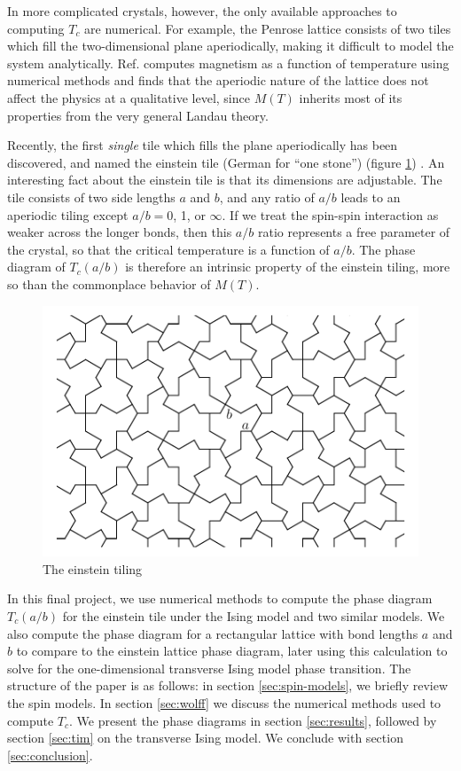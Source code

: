 \documentclass[amsmath,amssymb,aps,twocolumn,nofootinbib]{revtex4-2}
\begin{document}
In more complicated crystals, however, the only available approaches to computing $T_c$ are numerical. For example, the Penrose lattice consists of two tiles which fill the two-dimensional plane aperiodically, making it difficult to model the system analytically. Ref. \cite{penrose-ising} computes magnetism as a function of temperature using numerical methods and finds that the aperiodic nature of the lattice does not affect the physics at a qualitative level, since $M(T)$ inherits most of its properties from the very general Landau theory.

Recently, the first \textit{single} tile which fills the plane aperiodically has been discovered, and named the einstein tile (German for ``one stone'') (figure \ref{fig:einstein}) \cite{smith2023aperiodic}. An interesting fact about the einstein tile is that its dimensions are adjustable. The tile consists of two side lengths $a$ and $b$, and any ratio of $a/b$ leads to an aperiodic tiling except $a/b=0$, 1, or $\infty$. If we treat the spin-spin interaction as weaker across the longer bonds, then this $a/b$ ratio represents a free parameter of the crystal, so that the critical temperature is a function of $a/b$. The phase diagram of $T_c(a/b)$ is therefore an intrinsic property of the einstein tiling, more so than the commonplace behavior of $M(T)$.

\begin{figure}
  \centering
  \includegraphics[width=\linewidth]{../figs/einstein.pdf}
  \caption{The einstein tiling}
  \label{fig:einstein}
\end{figure}

In this final project, we use numerical methods to compute the phase diagram $T_c(a/b)$ for the einstein tile under the Ising model and two similar models. We also compute the phase diagram for a rectangular lattice with bond lengths $a$ and $b$ to compare to the einstein lattice phase diagram, later using this calculation to solve for the one-dimensional transverse Ising model phase transition. The structure of the paper is as follows: in section \ref{sec:spin-models}, we briefly review the spin models. In section \ref{sec:wolff} we discuss the numerical methods used to compute $T_c$. We present the phase diagrams in section \ref{sec:results}, followed by section \ref{sec:tim} on the transverse Ising model. We conclude with section \ref{sec:conclusion}.
\end{document}
